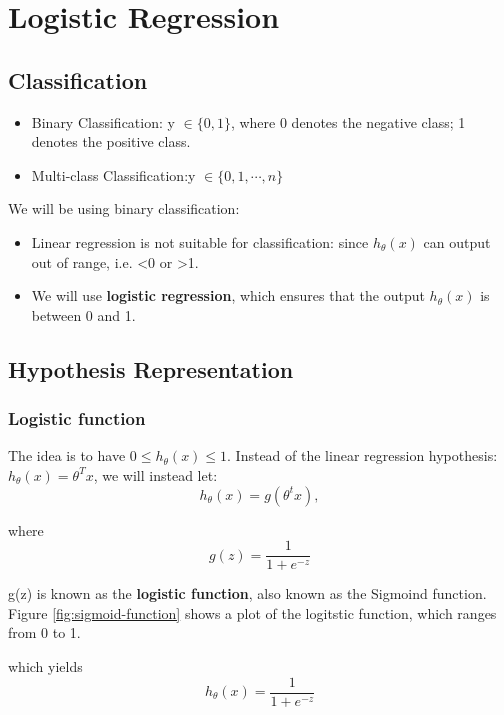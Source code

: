 \section{Logistic Regression}

    \subsection{Classification}
        
        \begin{itemize}
            \item Binary Classification: y $\in \{0, 1\}$, where 0 denotes the negative class; 1 denotes the positive class.
            \item Multi-class Classification:y $\in \{0, 1, \cdots, n\}$ 
        \end{itemize}

        We will be using binary classification: 
        \begin{itemize}
            \item Linear regression is not suitable for classification: since $h_\theta (x)$ can output out of range, i.e. <0 or >1. 
            \item We will use \textbf{logistic regression}, which ensures that the output $h_\theta (x)$ is between 0 and 1.
        \end{itemize}

    \subsection{Hypothesis Representation}

        \subsubsection{Logistic function}
            The idea is to have $ 0 \leq h_\theta (x) \leq 1$. Instead of the linear regression hypothesis: $h_\theta (x) = \theta^T x$, we will instead let:
                \[
                    h_\theta (x) = g (\theta^t x)
                ,\]

                where \[
                    g(z) = \frac{1}{1+e^{-z}}
                \]

                g(z) is known as the \textbf{logistic function}, also known as the Sigmoind function. Figure \ref{fig:sigmoid-function} shows a plot of the logitstic function, which ranges from 0 to 1. 


                which yields 
                \begin{equation}
                    h_\theta (x) = \frac{1}{1+e^{-z}}
                    \label{eq:log-reg-hypo}
                \end{equation}


